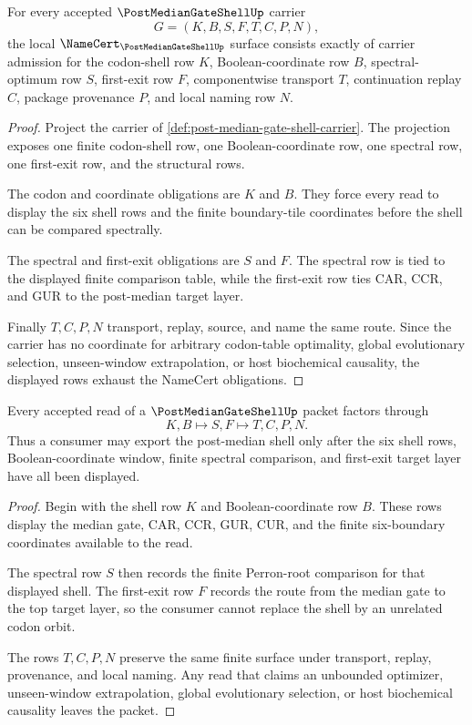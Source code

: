 \begin{theorem}
\label{thm:post-median-gate-shell-namecert-obligations}
For every accepted $\PostMedianGateShellUp$ carrier
$$
G=(K,B,S,F,T,C,P,N),
$$
the local $\NameCert_{\PostMedianGateShellUp}$ surface consists exactly of carrier admission for the codon-shell row $K$, Boolean-coordinate row $B$, spectral-optimum row $S$, first-exit row $F$, componentwise transport $T$, continuation replay $C$, package provenance $P$, and local naming row $N$.
\end{theorem}
\begin{proof}
Project the carrier of \autoref{def:post-median-gate-shell-carrier}. The projection exposes one finite codon-shell row, one Boolean-coordinate row, one spectral row, one first-exit row, and the structural rows.

The codon and coordinate obligations are $K$ and $B$. They force every read to display the six shell rows and the finite boundary-tile coordinates before the shell can be compared spectrally.

The spectral and first-exit obligations are $S$ and $F$. The spectral row is tied to the displayed finite comparison table, while the first-exit row ties $\mathrm{CAR}$, $\mathrm{CCR}$, and $\mathrm{GUR}$ to the post-median target layer.

Finally $T,C,P,N$ transport, replay, source, and name the same route. Since the carrier has no coordinate for arbitrary codon-table optimality, global evolutionary selection, unseen-window extrapolation, or host biochemical causality, the displayed rows exhaust the NameCert obligations.
\end{proof}

\begin{theorem}
\label{thm:post-median-gate-shell-accepted-read-frontier}
Every accepted read of a $\PostMedianGateShellUp$ packet factors through
$$
K,B
\longmapsto
S,F
\longmapsto
T,C,P,N .
$$
Thus a consumer may export the post-median shell only after the six shell rows, Boolean-coordinate window, finite spectral comparison, and first-exit target layer have all been displayed.
\end{theorem}
\begin{proof}
Begin with the shell row $K$ and Boolean-coordinate row $B$. These rows display the median gate, $\mathrm{CAR}$, $\mathrm{CCR}$, $\mathrm{GUR}$, $\mathrm{CUR}$, and the finite six-boundary coordinates available to the read.

The spectral row $S$ then records the finite Perron-root comparison for that displayed shell. The first-exit row $F$ records the route from the median gate to the top target layer, so the consumer cannot replace the shell by an unrelated codon orbit.

The rows $T,C,P,N$ preserve the same finite surface under transport, replay, provenance, and local naming. Any read that claims an unbounded optimizer, unseen-window extrapolation, global evolutionary selection, or host biochemical causality leaves the packet.
\end{proof}

